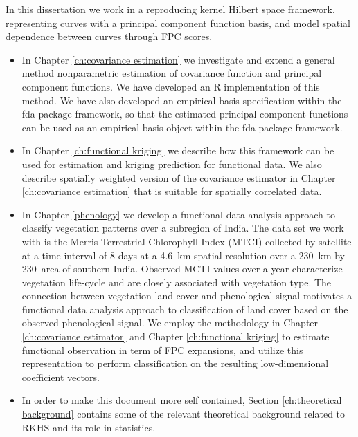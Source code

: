 In this dissertation we work in a reproducing kernel Hilbert space framework, representing curves with a principal component function basis, and model spatial dependence between curves through FPC scores.  
\begin{itemize}
\item In Chapter \ref{ch:covariance estimation} we investigate and extend a general method nonparametric estimation of covariance function and principal component functions. We have developed an R implementation of this method. We have also developed an empirical basis specification within the fda package framework, so that the estimated principal component functions can be used as an empirical basis object within the fda package framework.  %

\item In Chapter \ref{ch:functional kriging} we describe how this framework can be used for estimation and kriging prediction for functional data. We also describe spatially weighted version of the covariance estimator in Chapter \ref{ch:covariance estimation} that is suitable for spatially correlated data.

\item  In Chapter \ref{phenology} we develop a functional data analysis approach to classify vegetation patterns over a subregion of India. The data set we work with is the Merris Terrestrial Chlorophyll Index (MTCI) collected by satellite at a time interval of 8 days at a 4.6~km spatial resolution over a 230~km by 230~area of southern India. Observed MCTI values over a year characterize vegetation life-cycle and are closely associated with vegetation type. The connection between vegetation land cover and phenological signal motivates a functional data analysis approach to classification of land cover based on the observed phenological signal. We employ the methodology in Chapter \ref{ch:covariance estimator} and Chapter \ref{ch:functional kriging} to estimate functional observation in term of FPC expansions, and utilize this representation to perform classification on the resulting low-dimensional coefficient vectors. 

\item In order to make this document more self contained, Section \ref{ch:theoretical background} contains some of the relevant theoretical background related to RKHS and its role in statistics. 
\end{itemize}


